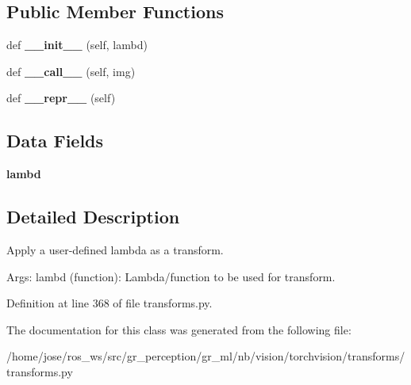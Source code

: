 \subsection*{Public Member Functions}
\begin{DoxyCompactItemize}
\item 
\mbox{\label{classtorchvision_1_1transforms_1_1transforms_1_1Lambda_a32fa7de586a121d74eca449f852c69e6}} 
def {\bfseries \+\_\+\+\_\+init\+\_\+\+\_\+} (self, lambd)
\item 
\mbox{\label{classtorchvision_1_1transforms_1_1transforms_1_1Lambda_a56bc4d59fe881cae361c2b8d5d425f1b}} 
def {\bfseries \+\_\+\+\_\+call\+\_\+\+\_\+} (self, img)
\item 
\mbox{\label{classtorchvision_1_1transforms_1_1transforms_1_1Lambda_a235e4bad99c1f79e7670a7ed846d3313}} 
def {\bfseries \+\_\+\+\_\+repr\+\_\+\+\_\+} (self)
\end{DoxyCompactItemize}
\subsection*{Data Fields}
\begin{DoxyCompactItemize}
\item 
\mbox{\label{classtorchvision_1_1transforms_1_1transforms_1_1Lambda_a433317b134e227643c0dc2ab56c6f58c}} 
{\bfseries lambd}
\end{DoxyCompactItemize}


\subsection{Detailed Description}
\begin{DoxyVerb}Apply a user-defined lambda as a transform.

Args:
    lambd (function): Lambda/function to be used for transform.
\end{DoxyVerb}
 

Definition at line 368 of file transforms.\+py.



The documentation for this class was generated from the following file\+:\begin{DoxyCompactItemize}
\item 
/home/jose/ros\+\_\+ws/src/gr\+\_\+perception/gr\+\_\+ml/nb/vision/torchvision/transforms/transforms.\+py\end{DoxyCompactItemize}
